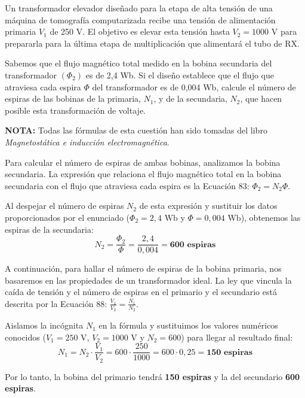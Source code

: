 \documentclass[11pt, a4paper]{article}
\newenvironment{problem}[1][Cuestión]{
	\vspace{0.5cm}
	\noindent{\Large\bfseries #1} \par\vspace{0.5cm}
}{
	\vspace{0.5cm}
}
\begin{document}
	\begin{problem}[Cuestión 4]
		Un transformador elevador diseñado para la etapa de alta tensión de una máquina de tomografía computarizada recibe una tensión de alimentación primaria $V_1$ de 250 V. El objetivo es elevar esta tensión hasta $V_2 = 1000 \text{ V}$ para prepararla para la última etapa de multiplicación que alimentará el tubo de RX.

		Sabemos que el flujo magnético total medido en la bobina secundaria del transformador $\left (\Phi_2 \right)$ es de 2,4 Wb. Si el diseño establece que el flujo que atraviesa cada espira $\Phi$ del transformador es de 0,004 Wb, calcule el número de espiras de las bobinas de la primaria, $N_1$, y de la secundaria, $N_2$, que hacen posible esta transformación de voltaje.

		{ \color{blue} 
			\textbf{NOTA:} Todas las fórmulas de esta cuestión han sido tomadas del libro \textit{Magnetostática e inducción electromagnética}.
		}

		{ \color{blue}
			Para calcular el número de espiras de ambas bobinas, analizamos la bobina secundaria. La expresión que relaciona el flujo magnético total en la bobina secundaria con el flujo que atraviesa cada espira es la Ecuación 83: $\Phi_2 = N_2 \Phi$.

			Al despejar el número de espiras $N_2$ de esta expresión y sustituir los datos proporcionados por el enunciado ($\Phi_2 = 2,4 \text{ Wb}$ y $\Phi = 0,004 \text{ Wb}$), obtenemos las espiras de la secundaria:
			\begin{equation*}
				N_2 = \frac{\Phi_2}{\Phi} = \frac{2,4}{0,004} = \mathbf{600 \text{ espiras}}
			\end{equation*}

			A continuación, para hallar el número de espiras de la bobina primaria, nos basaremos en las propiedades de un transformador ideal. La ley que vincula la caída de tensión y el número de espiras en el primario y el secundario está descrita por la Ecuación 88: $\frac{V_1}{V_2} = \frac{N_1}{N_2}$.

			Aislamos la incógnita $N_1$ en la fórmula y sustituimos los valores numéricos conocidos ($V_1 = 250 \text{ V}$, $V_2 = 1000 \text{ V}$ y $N_2 = 600$) para llegar al resultado final:
			\begin{equation*}
				N_1 = N_2 \cdot \frac{V_1}{V_2} = 600 \cdot \frac{250}{1000} = 600 \cdot 0,25 = \mathbf{150 \text{ espiras}}
			\end{equation*}

			Por lo tanto, la bobina del primario tendrá \textbf{150 espiras} y la del secundario \textbf{600 espiras}.
		}
	\end{problem}
\end{document}
